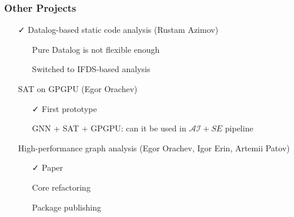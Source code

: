 \documentclass[xcolor=table,aspectratio=169]{beamer}
\begin{document}
\begin{frame}[fragile]
  \frametitle{Other Projects}
  
  \begin{itemize}
    \item[\faCheck] Datalog-based static code analysis (Rustam Azimov)
    \begin{itemize}
      \item[\faFrownO] Pure Datalog is not flexible enough
      \item[\faGears] Switched to IFDS-based analysis
    \end{itemize}
    \item[\faGears] SAT on GPGPU (Egor Orachev)
    \begin{itemize}
      \item[\faCheck] First prototype
      \item[\faGears] GNN + SAT + GPGPU: can it be used in $\mathcal{AI}+SE$ pipeline 
    \end{itemize}
    \item[\faGears] High-performance graph analysis (Egor Orachev, Igor Erin, Artemii Patov)
    \begin{itemize}
      \item[\faCheck] Paper
      \item[\faGears] Core refactoring
      \item[\faGears] Package publishing
    \end{itemize}
  \end{itemize}
\end{frame}
\end{document}
